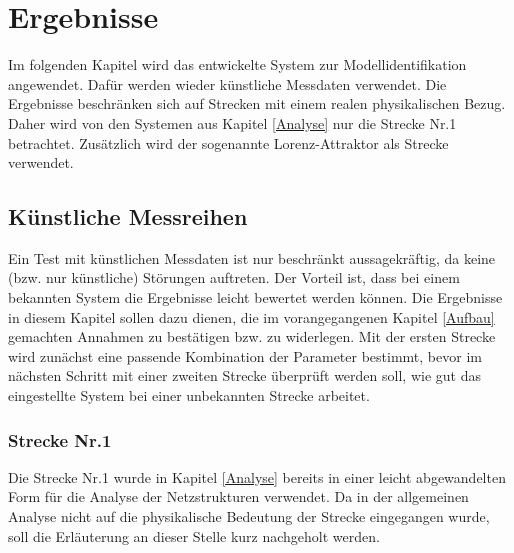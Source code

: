 \chapter{Ergebnisse}
    \label{Ergebnisse}
    Im folgenden Kapitel wird das entwickelte System zur Modellidentifikation angewendet. Dafür werden wieder künstliche Messdaten verwendet. Die Ergebnisse beschränken sich 
    auf Strecken mit einem realen physikalischen Bezug. Daher wird von den Systemen aus Kapitel \ref{Analyse} nur die Strecke Nr.1 betrachtet. Zusätzlich wird der sogenannte 
    Lorenz-Attraktor als Strecke verwendet.
    \section{Künstliche Messreihen}
        Ein Test mit künstlichen Messdaten ist nur beschränkt aussagekräftig, da keine (bzw. nur künstliche) Störungen auftreten. Der Vorteil ist, dass bei einem 
        bekannten System die Ergebnisse leicht bewertet werden können. Die Ergebnisse in diesem Kapitel sollen dazu dienen, die im vorangegangenen Kapitel \ref{Aufbau} gemachten Annahmen 
        zu bestätigen bzw. zu widerlegen. Mit der ersten Strecke wird zunächst eine passende Kombination der Parameter bestimmt, bevor im nächsten Schritt mit einer zweiten Strecke
        überprüft werden soll, wie gut das eingestellte System bei einer unbekannten Strecke arbeitet.
        \subsection{Strecke Nr.1}
            Die Strecke Nr.1 wurde in Kapitel \ref{Analyse} bereits in einer leicht abgewandelten Form für die Analyse der Netzstrukturen verwendet. 
            Da in der allgemeinen Analyse nicht auf die physikalische 
            Bedeutung der Strecke eingegangen wurde, soll die Erläuterung an dieser Stelle kurz nachgeholt werden.
